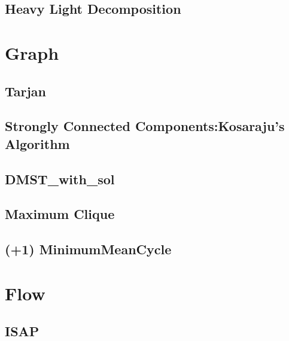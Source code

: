 \documentclass[10pt,twocolumn,oneside]{article}
\begin{document}
\subsection {Heavy Light Decomposition}


\section{Graph}

\subsection{Tarjan}


\subsection{Strongly Connected Components:Kosaraju's Algorithm}


%

\newpage

\subsection{DMST\_with\_sol}


\subsection{Maximum Clique}


\subsection{(+1) MinimumMeanCycle}


\section{Flow}
\subsection{ISAP} %

\end{document}

